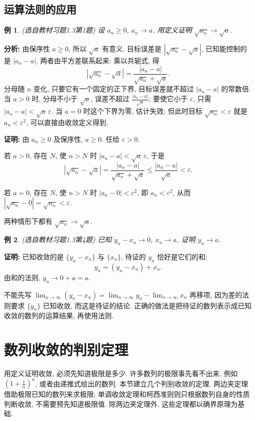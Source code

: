 \documentclass[UTF8,openany]{ctexbook}
\theoremstyle{chinesetextbook}
\newtheorem{example}{例}[section]
\newenvironment{cnproof}{\par\indent\textbf{证明:} \ignorespaces}{\par}
\begin{document}
\subsection{运算法则的应用}
\begin{example}
\textnormal{(选自教材习题1.3第1题)} 设 $a_n\ge0$, $a_n\to a$, 用定义证明 $\sqrt{a_n}\to\sqrt a$.
\end{example}
\par\indent\textbf{分析:} 由保序性 $a\ge0$, 所以 $\sqrt a$ 有意义. 目标误差是 $|\sqrt{a_n}-\sqrt a|$, 已知能控制的是 $|a_n-a|$. 两者由平方差联系起来: 乘以共轭式, 得
\[
|\sqrt{a_n}-\sqrt a|=\frac{|a_n-a|}{\sqrt{a_n}+\sqrt a}.
\]
分母随 $n$ 变化, 只要它有一个固定的正下界, 目标误差就不超过 $|a_n-a|$ 的常数倍. 当 $a>0$ 时, 分母不小于 $\sqrt a$, 误差不超过 $\displaystyle\frac{|a_n-a|}{\sqrt a}$; 要使它小于 $\varepsilon$, 只需 $|a_n-a|<\sqrt a\,\varepsilon$. 当 $a=0$ 时这个下界为零, 估计失效; 但此时目标 $\sqrt{a_n}<\varepsilon$ 就是 $a_n<\varepsilon^2$, 可以直接由收敛定义得到.
\begin{cnproof}
由 $a_n\ge0$ 及保序性, $a\ge0$. 任给 $\varepsilon>0$.

若 $a>0$, 存在 $N$, 使 $n>N$ 时 $|a_n-a|<\sqrt a\,\varepsilon$, 于是
\[
|\sqrt{a_n}-\sqrt a|=\frac{|a_n-a|}{\sqrt{a_n}+\sqrt a}\le\frac{|a_n-a|}{\sqrt a}<\varepsilon.
\]

若 $a=0$, 存在 $N$, 使 $n>N$ 时 $|a_n-0|<\varepsilon^2$, 即 $a_n<\varepsilon^2$, 从而 $|\sqrt{a_n}-0|=\sqrt{a_n}<\varepsilon$.

两种情形下都有 $\sqrt{a_n}\to\sqrt a$.
\end{cnproof}
\begin{example}
\textnormal{(选自教材习题1.3第4题)} 已知 $y_n-x_n\to0$, $x_n\to a$, 证明 $y_n\to a$.
\end{example}
\begin{cnproof}
已知收敛的是 $\{y_n-x_n\}$ 与 $\{x_n\}$, 待证的 $y_n$ 恰好是它们的和:
\[
y_n=(y_n-x_n)+x_n.
\]
由和的法则, $y_n\to0+a=a$.
\end{cnproof}
不能先写 $\displaystyle\lim_{n\to\infty}(y_n-x_n)=\lim_{n\to\infty}y_n-\lim_{n\to\infty}x_n$ 再移项, 因为差的法则要求 $\{y_n\}$ 已知收敛, 而这是待证的结论. 正确的做法是把待证的数列表示成已知收敛的数列的运算结果, 再使用法则.
\section{数列收敛的判别定理}
用定义证明收敛, 必须先知道极限是多少. 许多数列的极限事先看不出来, 例如 $\displaystyle\left(1+\frac1n\right)^n$, 或者由递推式给出的数列. 本节建立几个判别收敛的定理. 两边夹定理借助极限已知的数列来求极限; 单调收敛定理和柯西准则则只根据数列自身的性质判断收敛, 不需要预先知道极限值. 除两边夹定理外, 这些定理都以确界原理为基础.
\end{document}
